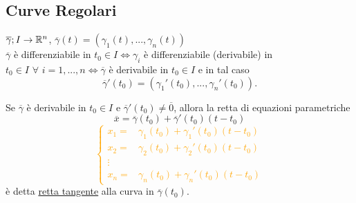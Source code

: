 \begin{exbar}
\end{exbar}


\subsection{Curve Regolari}

$\overline{\gamma}; I \rightarrow \mathbb{R}^n$,
$\overline{\gamma}(t)=(\gamma_1(t),...,\gamma_n(t))$\\
$\overline{\gamma}$ è differenziabile in $t_0 \in I \Leftrightarrow \gamma_i$ è differenziabile (derivabile) in $t_0 \in I \,\, \forall\,\, i =1,...,n \Leftrightarrow \overline{\gamma}$ è derivabile in $t_0 \in I$ e in tal caso
\begin{equation*}
	\overline{\gamma}'(t_0)=\left( \gamma_1'(t_0),...,\gamma_n'(t_0) \right).
\end{equation*}


\begin{definition}
		Se $\overline{\gamma}$ è derivabile in $t_0 \in I$ e $\overline{\gamma}' (t_0)\neq {}$, allora la retta di equazioni parametriche
	\begin{equation*}
		\overline{x}=\overline{\gamma}(t_0)+\overline{\gamma}'(t_0)(t-t_0)
	\end{equation*}
	\textcolor{orange}{
		\begin{equation*}
			\begin{cases}
				x_1=&\gamma_1(t_0)+\gamma_1'(t_0)(t-t_0)\\
				x_2=&\gamma_2(t_0)+\gamma_2'(t_0)(t-t_0)\\
				\vdots\\
				x_n=&\gamma_n(t_0)+\gamma_n'(t_0)(t-t_0)
			\end{cases}
		\end{equation*}
	}
	è detta \underline{retta tangente} alla curva in $\overline{\gamma}(t_0)$.
\end{definition}


